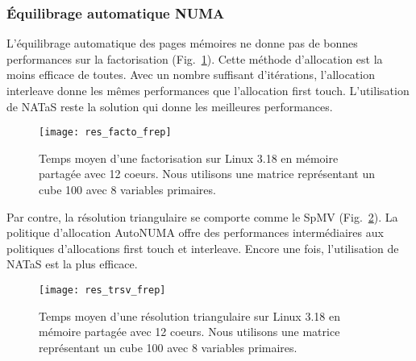 \subsubsection{\'Equilibrage automatique NUMA}
L'équilibrage automatique des pages mémoires ne donne pas de bonnes performances sur la factorisation (Fig.~\ref{fig:res_facto_frep}).
%
Cette méthode d'allocation est la moins efficace de toutes.
%
Avec un nombre suffisant d'itérations, l'allocation interleave donne les mêmes performances que l'allocation first touch.
%
L'utilisation de NATaS reste la solution qui donne les meilleures performances.

\begin{figure}
  \centering
  \texttt{[image: res\_facto\_frep]}
  \caption{Temps moyen d'une factorisation sur Linux 3.18 en mémoire partagée avec 12 coeurs. Nous utilisons une matrice représentant un cube 100 avec 8 variables primaires.}
  \label{fig:res_facto_frep}
\end{figure}
Par contre, la résolution triangulaire se comporte comme le SpMV (Fig.~\ref{fig:res_trsv_frep}).
%
La politique d'allocation AutoNUMA offre des performances intermédiaires aux politiques d'allocations first touch et interleave.
%
Encore une fois, l'utilisation de NATaS est la plus efficace.

\begin{figure}
  \centering
  \texttt{[image: res\_trsv\_frep]}
  \caption{Temps moyen d'une résolution triangulaire sur Linux 3.18 en mémoire partagée avec 12 coeurs. Nous utilisons une matrice représentant un cube 100 avec 8 variables primaires.}
  \label{fig:res_trsv_frep}
\end{figure}
